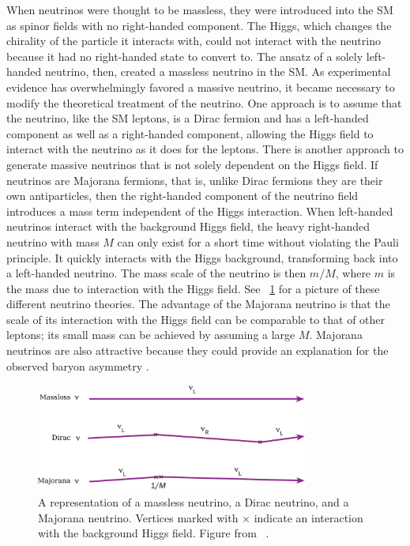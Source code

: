 When neutrinos were thought to be massless, they were introduced into the SM as spinor fields with no right-handed component.  The Higgs, which changes the chirality of the particle it interacts with, could not interact with the neutrino because it had no right-handed state to convert to.  The ansatz of a solely left-handed neutrino, then, created a massless neutrino in the SM.  As experimental evidence has overwhelmingly favored a massive neutrino, it became necessary to modify the theoretical treatment of the neutrino.  One approach is to assume that the neutrino, like the SM leptons, is a Dirac fermion and has a left-handed component as well as a right-handed component, allowing the Higgs field to interact with the neutrino as it does for the leptons.  There is another approach to generate massive neutrinos that is not solely dependent on the Higgs field.  If neutrinos are Majorana fermions, that is, unlike Dirac fermions they are their own antiparticles, then the right-handed component of the neutrino field introduces a mass term independent of the Higgs interaction.  When left-handed neutrinos interact with the background Higgs field, the heavy right-handed neutrino with mass $M$ can only exist for a short time without violating the Pauli principle.  It quickly interacts with the Higgs background, transforming back into a left-handed neutrino.  The mass scale of the neutrino is then $m/M$, where $m$ is the mass due to interaction with the Higgs field.  See {\fig}~\ref{fig:neutrinoMass} for a picture of these different neutrino theories.  The advantage of the Majorana neutrino is that the scale of its interaction with the Higgs field can be comparable to that of other leptons; its small mass can be achieved by assuming a large $M$.  Majorana neutrinos are also attractive because they could provide an explanation for the observed baryon asymmetry \citep{baryogenesis_Fukugita}.  
\begin{figure}[htp]
\centering
\includegraphics[width=0.8\textwidth]{figures/neutrinoMass.eps}
\caption[A depiction of massless, Dirac, and Majorana models of the neutrino.]{A representation of a massless neutrino, a Dirac neutrino, and a Majorana neutrino.  Vertices marked with $\times$ indicate an interaction with the background Higgs field.  Figure from {}~\citep{neutrinoMass}.}
\label{fig:neutrinoMass}
\end{figure}  

